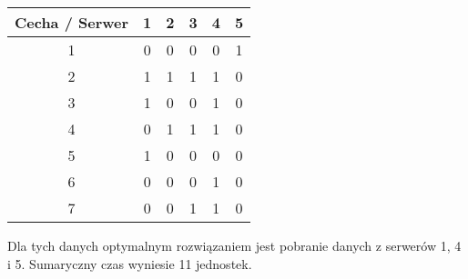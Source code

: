 \documentclass[12pt, a4paper]{article}
\begin{document}
\begin{center}
\begin{tabular}{|c|c|c|c|c|c|}
  \hline
  Cecha / Serwer & 1 & 2 & 3 & 4 & 5 \\
  \hline
  1 & 0 & 0 & 0 & 0 & 1 \\
  \hline
  2 & 1 & 1 & 1 & 1 & 0 \\
  \hline
  3 & 1 & 0 & 0 & 1 & 0 \\
  \hline
  4 & 0 & 1 & 1 & 1 & 0 \\
  \hline
  5 & 1 & 0 & 0 & 0 & 0 \\
  \hline
  6 & 0 & 0 & 0 & 1 & 0 \\
  \hline
  7 & 0 & 0 & 1 & 1 & 0 \\
  \hline
\end{tabular}
\end{center}
Dla tych danych optymalnym rozwiązaniem jest pobranie danych z serwerów 1, 4 i 5. Sumaryczny czas wyniesie 11 jednostek.

 





\end{document}
